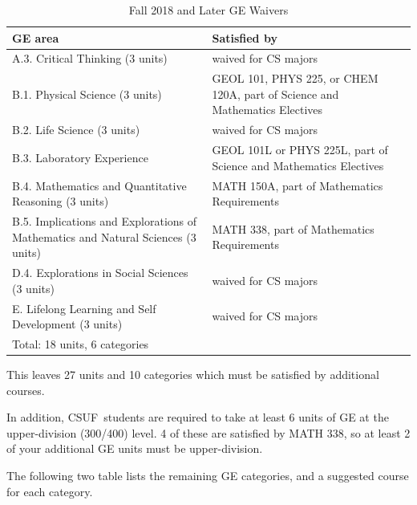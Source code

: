 \documentclass{book}
\newcommand{\CampusName}{CSUF}
\begin{document}
\begin{table}
\caption{Fall 2018 and Later GE Waivers}
\begin{center}
\begin{tabular}{| p{3in} | p{3in} |} \hline
  \textbf{GE area} & \textbf{Satisfied by} \\ \hline
  A.3. Critical Thinking (3 units) & waived for CS majors \\ \hline
  B.1. Physical Science (3 units) & GEOL 101, PHYS 225, or CHEM 120A, part of Science and Mathematics Electives \\ \hline
  B.2. Life Science (3 units) & waived for CS majors \\ \hline
  B.3. Laboratory Experience & GEOL 101L or PHYS 225L, part of Science and Mathematics Electives \\ \hline
  B.4. Mathematics and Quantitative Reasoning (3 units) & MATH 150A, part of Mathematics Requirements \\ \hline
  B.5. Implications and Explorations of Mathematics and Natural Sciences (3 units) & MATH 338, part of Mathematics Requirements \\ \hline
  D.4. Explorations in Social Sciences (3 units) & waived for CS majors \\ \hline
  E. Lifelong Learning and Self Development (3 units) & waived for CS majors \\ \hline
  \multicolumn{2}{|l|}{Total: 18 units, 6 categories} \\ \hline
\end{tabular}
\end{center}
\end{table}

This leaves 27 units and 10 categories which must be satisfied by
additional courses.

In addition, \CampusName~students are required to take at least 6
units of GE at the upper-division (300/400) level. 4 of these are
satisfied by MATH 338, so at least 2 of your additional GE units must
be upper-division.

The following two table lists the remaining GE categories, and a
suggested course for each category.
\end{document}
